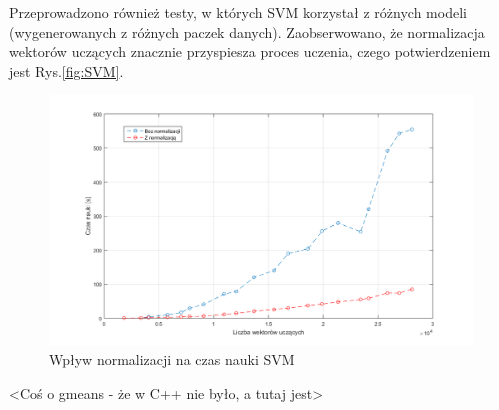 Przeprowadzono również testy, w których SVM korzystał z różnych modeli (wygenerowanych z różnych paczek danych). Zaobserwowano, że normalizacja wektorów uczących znacznie przyspiesza proces uczenia, czego potwierdzeniem jest Rys.\ref{fig:SVM}.

\begin{figure}[!htp]
	\centering
	\includegraphics[width=15cm]{Grafika/SVMTrain}
	\caption{Wpływ normalizacji na czas nauki SVM}
	\label{fig:TrainNormSVM}
\end{figure}



<Coś o gmeans - że w C++ nie było, a tutaj jest>

